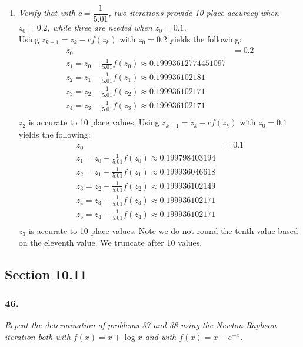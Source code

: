 \documentclass[12pt]{article}
\begin{document}
\begin{enumerate}[\it\ \ (a)\ \ ]
\item {\it Verify that with $c = \dfrac{1}{5.01}$, two iterations provide 10-place accuracy when $z_0 = 0.2$, while three are needed when $z_0 = 0.1$.}\\

\noindent Using $z_{k+1} = z_k - cf(z_k)$ with $z_0 = 0.2$ yields the following:
\begin{align*}
z_0 &= 0.2 \\
z_1 = z_0 - \frac{1}{5.01}f(z_0) \approx 0.19993612774451097 \\
z_2 = z_1 - \frac{1}{5.01}f(z_1) \approx 0.199936102181 \\
z_3 = z_2 - \frac{1}{5.01}f(z_2) \approx 0.199936102171 \\
z_4 = z_3 - \frac{1}{5.01}f(z_3) \approx 0.199936102171 \\
\end{align*}
$z_2$ is accurate to 10 place values.  Using $z_{k+1} = z_k - cf(z_k)$ with $z_0 = 0.1$ yields the following:
\begin{align*}
z_0 &= 0.1 \\
z_1 = z_0 - \frac{1}{5.01}f(z_0) \approx 0.199798403194 \\
z_2 = z_1 - \frac{1}{5.01}f(z_1) \approx 0.199936046618 \\
z_3 = z_2 - \frac{1}{5.01}f(z_2) \approx 0.199936102149 \\
z_4 = z_3 - \frac{1}{5.01}f(z_3) \approx 0.199936102171 \\
z_5 = z_4 - \frac{1}{5.01}f(z_4) \approx 0.199936102171 \\
\end{align*}
$z_3$ is accurate to 10 place values.  Note we do not round the tenth value based on the eleventh value.  We truncate after 10 values.

\end{enumerate}

\subsection*{Section 10.11}

\subsubsection*{46.}
{\it Repeat the determination of problems 37 \sout{and 38} using the Newton-Raphson iteration both with $f(x) = x + \log{x}$ and with $f(x) = x - e^{-x}$.}\\
\end{document}
